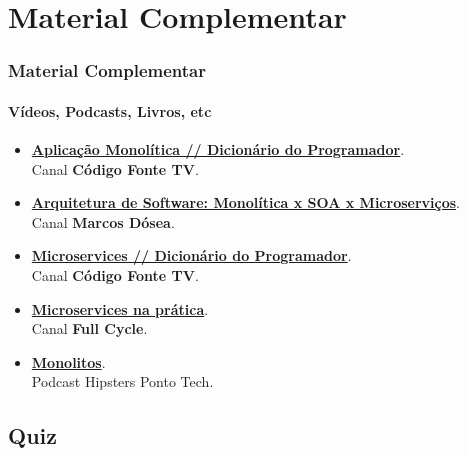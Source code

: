 \documentclass[
	10pt, %
	t, %
]{beamer}
\newcommand{\iconLink}[2]{\href{#1}{\faLink \hspace{0.2em} {#2}}}
\begin{document}
		
		


\section{Material Complementar}

\begin{frame}
	\frametitle{Material Complementar}
	\framesubtitle{Vídeos, Podcasts, Livros, etc}
	
	\begin{itemize}
		\item \href{https://youtu.be/CsrHHHPHKwE}{\textbf{Aplicação Monolítica // Dicionário do Programador}}.\\Canal \textbf{Código Fonte TV}.
		\item \href{https://youtu.be/suZfVAk7hco}{\textbf{Arquitetura de Software: Monolítica x SOA x Microserviços}}.\\Canal \textbf{Marcos Dósea}.
		\item \href{https://www.youtube.com/watch?v=_2bDOCTnbKc}{\textbf{Microservices // Dicionário do Programador}}.\\Canal \textbf{Código Fonte TV}.
		\item \href{https://youtu.be/gtv9szE_P1U}{\textbf{Microservices na prática}}.\\Canal \textbf{Full Cycle}.
		\item \href{https://www.hipsters.tech/uma-linguagem-para-cada-combate-hipsters-ponto-tech-277}{\textbf{Monolitos}}.\\Podcast Hipsters Ponto Tech.
	\end{itemize}
	
\end{frame}

\subsection{Quiz}
\end{document}
